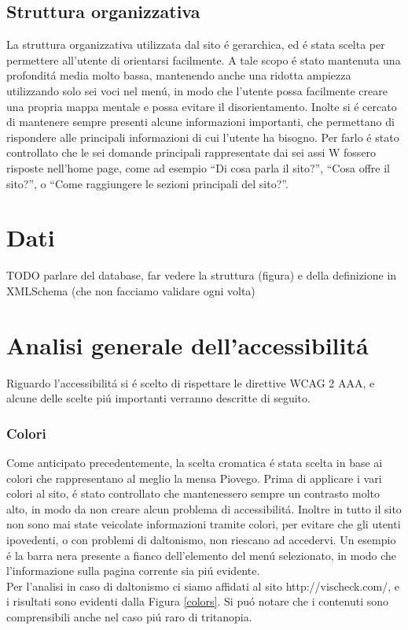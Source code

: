 \documentclass[10pt,a4paper,onecolumn]{article}
\begin{document}
\subsection{Struttura organizzativa}

La struttura organizzativa utilizzata dal sito \'e gerarchica, ed \'e stata scelta per permettere all'utente di orientarsi facilmente. A tale scopo \'e stato mantenuta una profondit\'a media molto bassa, mantenendo anche una ridotta ampiezza utilizzando solo sei voci nel men\'u, in modo che l'utente possa facilmente creare una propria mappa mentale e possa evitare il disorientamento.
Inolte si \'e cercato di mantenere sempre presenti alcune informazioni importanti, che permettano di rispondere alle principali informazioni di cui l'utente ha bisogno. Per farlo \'e stato controllato che le sei domande principali rappresentate dai sei assi W fossero risposte nell'home page, come ad esempio ``Di cosa parla il sito?'', ``Cosa offre il sito?'', o ``Come raggiungere le sezioni principali del sito?''.

\section{Dati}

TODO parlare del database, far vedere la struttura (figura) e della definizione in XMLSchema (che non facciamo validare ogni volta)

\section{Analisi generale dell'accessibilit\'a}

Riguardo l'accessibilit\'a si \'e scelto di rispettare le direttive WCAG 2 AAA, e alcune delle scelte pi\'u importanti verranno descritte di seguito.

\subsubsection{Colori}

Come anticipato precedentemente, la scelta cromatica \'e stata scelta in base ai colori che rappresentano al meglio la mensa Piovego. Prima di applicare i vari colori al sito, \'e stato controllato che mantenessero sempre un contrasto molto alto, in modo da non creare alcun problema di accessibilit\'a. Inoltre in tutto il sito non sono mai state veicolate informazioni tramite colori, per evitare che gli utenti ipovedenti, o con problemi di daltonismo, non riescano ad accedervi. Un esempio \'e la barra nera presente a fianco dell'elemento del men\'u selezionato, in modo che l'informazione sulla pagina corrente sia pi\'u evidente. \\
Per l'analisi in caso di daltonismo ci siamo affidati al sito http://vischeck.com/, e i risultati sono evidenti dalla Figura \ref{colors}. Si pu\'o notare che i contenuti sono comprensibili anche nel caso pi\'u raro di tritanopia. \\
\end{document}
